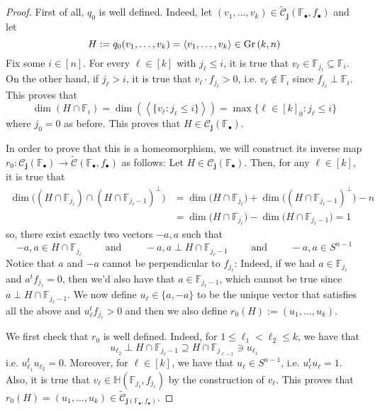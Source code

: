 \begin{proof} First of all, $q_0$ is well defined. Indeed, let $(v_1,\ldots,v_k)\in\tilde{\mathcal{C}}_{\mathbf{j}}(\mathbb{F}_{\bullet},f_{\bullet})$ and let
\[H:=q_0(v_1,\ldots,v_k)=\left<v_1,\ldots,v_k\right>\in\Gr{k}{n}\]
Fix some $i\in[n]$. For every $\ell\in[k]$ with $j_{\ell}\leq i$, it is true that $v_{\ell}\in\mathbb{F}_{j_{\ell}}\subseteq\mathbb{F}_i$. On the other hand, if $j_{\ell}>i$, it is true that $v_{\ell}\cdot f_{j_{\ell}}>0$, i.e. $v_{\ell}\not\in\mathbb{F}_i$ since $f_{j_{\ell}}\perp\mathbb{F}_i$. This proves that
\[\dim(H\cap\mathbb{F}_i)=\dim\left(\left<\big\{v_{\ell}:j_{\ell}\leq i\big\}\right>\right)=\max\{\ell\in[k]_0:j_{\ell}\leq i\}\]
where $j_0=0$ as before. This proves that $H\in\mathcal{C}_{\mathbf{j}}(\mathbb{F}_{\bullet})$.

In order to prove that this is a homeomorphism, we will construct its inverse map $r_0:\mathcal{C}_{\mathbf{j}}(\mathbb{F}_{\bullet})\to\tilde{\mathcal{C}}(\mathbb{F}_{\bullet},f_{\bullet})$ as follows: Let $H\in\mathcal{C}_{\mathbf{j}}(\mathbb{F}_{\bullet})$. Then, for any $\ell\in[k]$, it is true that
\begin{align*}
\dim\big(\left(H\cap\mathbb{F}_{j_{\ell}}\right)\cap\left(H\cap\mathbb{F}_{j_{\ell}-1}\right)^{\perp}\big)&=\dim\big(H\cap\mathbb{F}_{j_{\ell}}\big)+\dim\big(\left(H\cap\mathbb{F}_{j_{\ell}-1}\right)^{\perp}\big)-n\\
&=\dim\big(H\cap\mathbb{F}_{j_{\ell}}\big)-\dim\big(H\cap\mathbb{F}_{j_{\ell}-1}\big)=1
\end{align*}
so, there exist exactly two vectors $-a,a$ such that
\[-a,a\in H\cap\mathbb{F}_{j_{\ell}}\qquad\text{ and }\qquad-a,a\perp H\cap\mathbb{F}_{j_{\ell}-1}\qquad\text{ and }\qquad-a,a\in S^{n-1}\]
Notice that $a$ and $-a$ cannot be perpendicular to $f_{j_{\ell}}$: Indeed, if we had $a\in\mathbb{F}_{j_{\ell}}$ and $a^tf_{j_{\ell}}=0$, then we'd also have that $a\in\mathbb{F}_{j_{\ell}-1}$, which cannot be true since $a\perp H\cap\mathbb{F}_{j_{\ell}-1}$. We now define $u_{\ell}\in\{a,-a\}$ to be the unique vector that satisfies all the above and $u_{\ell}^tf_{j_{\ell}}>0$ and then we also define $r_0(H):=(u_1,\ldots,u_k)$.

We first check that $r_0$ is well defined. Indeed, for $1\leq\ell_1<\ell_2\leq k$, we have that \[u_{\ell_2}\perp H\cap\mathbb{F}_{j_{\ell}-1}\supseteq H\cap\mathbb{F}_{j_{\ell-1}}\ni u_{\ell_1}\]
i.e. $u_{\ell_1}^tu_{\ell_2}=0$. Moreover, for $\ell\in[k]$, we have that $u_{\ell}\in S^{n-1}$, i.e. $u_{\ell}^tu_{\ell}=1$. Also, it is true that $v_{\ell}\in\mathbb{H}(\mathbb{F}_{j_{\ell}},f_{j_{\ell}})$ by the construction of $v_{\ell}$. This proves that $r_0(H)=(u_1,\ldots,u_k)\in\tilde{\mathcal{C}}_{\mathbf{j}(\mathbb{F}_{\bullet},f_{\bullet})}$.


\end{proof}
